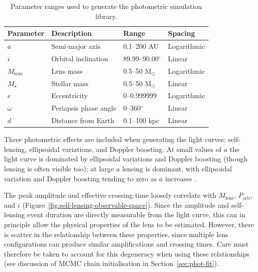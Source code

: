 \documentclass[fleqn,usenatbib]{mnras}
\begin{document}
\begin{table}
    \centering
    \caption{Parameter ranges used to generate the photometric simulation library.}
    \label{tab:phot_sim_parameter_ranges}
    \begin{tabular}{llll}
        \hline
        Parameter         & Description           & Range                & Spacing     \\
        \hline
        $a$               & Semi-major axis       & 0.1--200 AU          & Logarithmic \\
        $i$               & Orbital inclination   & 89.99--90.00$^\circ$ & Linear      \\
        $M_\mathrm{lens}$ & Lens mass             & 0.5--50 M$_\odot$    & Logarithmic \\
        $M_\star$         & Stellar mass          & 0.5--50 M$_\odot$    & Linear      \\
        $e$               & Eccentricity          & 0--0.999999          & Logarithmic \\
        $\omega$          & Periapsis phase angle & 0--360$^\circ$       & Linear      \\
        $d$               & Distance from Earth   & 0.1--100 kpc         & Linear      \\
        \hline
    \end{tabular}
\end{table}

Three photometric effects are included when generating the light curves: self-lensing, ellipsoidal variations, and Doppler boosting. At small values of $a$ the light curve is dominated by ellipsoidal variations and Doppler boosting (though lensing is often visible too); at large $a$ lensing is dominant, with ellipsoidal variation and Doppler boosting tending to zero as $a$ increases \citep{sorabella_modeling_2022}.

The peak amplitude and effective crossing time loosely correlate with $M_\mathrm{lens}$, $P_\mathrm{orb}$, and $i$ (Figure~\ref{fig:self-lensing-observable-space}). Since the amplitude and self-lensing event duration are directly measurable from the light curve, this can in principle allow the physical properties of the lens to be estimated. However, there is scatter in the relationship between these properties, since multiple lens configurations can produce similar amplifications and crossing times. Care must therefore be taken to account for this degeneracy when using these relationships (see discussion of MCMC chain initialisation in Section~\ref{sec:phot-fit}).
\end{document}
